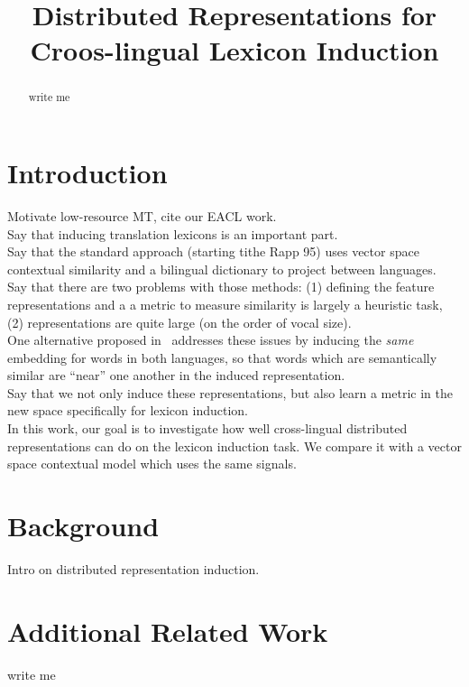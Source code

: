 \documentclass[11pt,letterpaper]{article}
\title{Distributed Representations for Croos-lingual Lexicon Induction}
\date{}
\begin{document}
\maketitle
\begin{abstract}
write me
\end{abstract}

\section{Introduction}

Motivate low-resource MT, cite our EACL work.\\

Say that inducing translation lexicons is an important part. \\

Say that the standard approach (starting tithe Rapp 95) uses vector space contextual similarity and a bilingual dictionary to project between languages. \\

Say that there are two problems with those methods: (1) defining the feature representations and a   a metric to measure similarity is largely a heuristic task, (2) representations are quite large (on the order of vocal size).\\

One alternative proposed in~\cite{Klementiev:2012} addresses these issues by inducing the \emph{same} embedding for words in both languages, so that words which are semantically similar are ``near'' one another in the induced representation.\\

Say that we not only induce these representations, but also learn a metric in the new space specifically for lexicon induction.\\

In this work, our goal is to investigate how well cross-lingual distributed representations can do on the lexicon induction task.  We compare it with a vector space contextual model which uses the same signals. \\

\section{Background}

Intro on distributed representation induction.

\section{Additional Related Work}
write me
\end{document}

